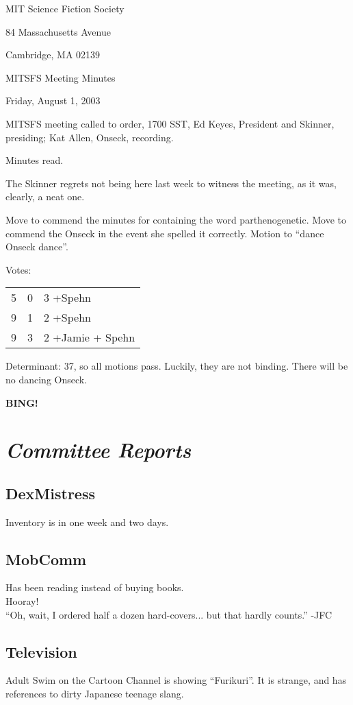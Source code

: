 \documentclass[10pt]{article}
\newcommand{\bing}{{\bf BING!} }
\newcommand{\goto}[1]{\bing \vskip 12pt \section*{{\em{#1}}}}
\begin{document}
\begin{center}

MIT Science Fiction Society 

84 Massachusetts Avenue

Cambridge, MA 02139

\vspace{12pt}

MITSFS Meeting Minutes 

Friday, August 1, 2003

\end{center}
 
\vspace{18pt}

\setlength{\parskip}{6pt}

\noindent
MITSFS meeting called to order, 1700 SST, Ed Keyes, President and
Skinner, presiding; Kat Allen,  Onseck, recording.

Minutes read.

The Skinner regrets not being here last week to witness the meeting,
as it was, clearly, a neat one.

Move to commend the minutes for containing the word parthenogenetic.
Move to commend the Onseck in the event she spelled it correctly.
Motion to ``dance Onseck dance''.

Votes: 
\begin{tabular}{ccl}
5 & 0 & 3 +Spehn \\
9 & 1 & 2 +Spehn \\
9 & 3 & 2 +Jamie + Spehn\\
\end{tabular}
Determinant: 37, so all motions pass. Luckily, they are not binding. There will be no
       dancing Onseck.


\goto{Committee Reports}
\subsection*{DexMistress}
Inventory is in one week and two days.

\subsection*{MobComm}
Has been reading instead of buying books.\\
Hooray!\\
``Oh, wait, I ordered half a dozen hard-covers... but that hardly counts.'' -JFC

\subsection*{Television}
Adult Swim on the Cartoon Channel is showing ``Furikuri''.  It is
strange, and has references to dirty Japanese teenage slang.
\end{document}

